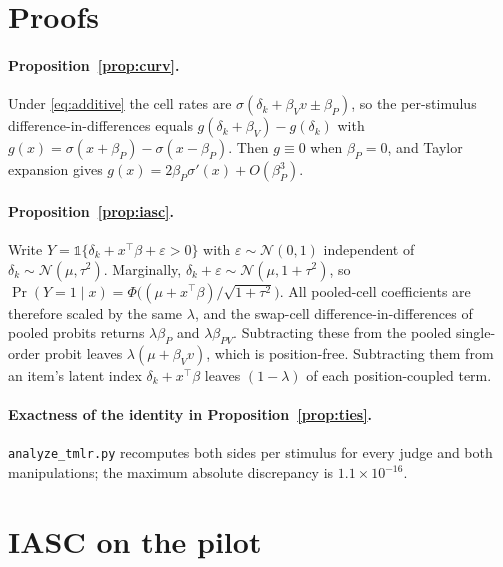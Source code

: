 \documentclass[10pt]{article}
\theoremstyle{remark}
\begin{document}
\section{Proofs}
\label{app:proofs}

\paragraph{Proposition~\ref{prop:curv}.}
Under \eqref{eq:additive} the cell rates are
$\sigma(\delta_k+\beta_V v\pm\beta_P)$, so the per-stimulus
difference-in-differences equals $g(\delta_k+\beta_V)-g(\delta_k)$ with
$g(x)=\sigma(x+\beta_P)-\sigma(x-\beta_P)$. Then $g\equiv0$ when
$\beta_P=0$, and Taylor expansion gives
$g(x)=2\beta_P\sigma'(x)+O(\beta_P^3)$.

\paragraph{Proposition~\ref{prop:iasc}.}
Write $Y=\mathbb 1\{\delta_k+x^\top\beta+\varepsilon>0\}$ with
$\varepsilon\sim\mathcal N(0,1)$ independent of
$\delta_k\sim\mathcal N(\mu,\tau^2)$. Marginally,
$\delta_k+\varepsilon\sim\mathcal N(\mu,1+\tau^2)$, so
$\Pr(Y=1\mid x)=\Phi\bigl((\mu+x^\top\beta)/\sqrt{1+\tau^2}\bigr)$. All
pooled-cell coefficients are therefore scaled by the same $\lambda$, and
the swap-cell difference-in-differences of pooled probits returns
$\lambda\beta_P$ and $\lambda\beta_{PV}$. Subtracting these from the
pooled single-order probit leaves $\lambda(\mu+\beta_V v)$, which is
position-free. Subtracting them from an item's latent index
$\delta_k+x^\top\beta$ leaves $(1-\lambda)$ of each position-coupled
term.

\paragraph{Exactness of the identity in Proposition~\ref{prop:ties}.}
\texttt{analyze\_tmlr.py} recomputes both sides per stimulus for every
judge and both manipulations; the maximum absolute discrepancy is
$1.1\times10^{-16}$.

\section{IASC on the pilot}
\label{app:iasc}
\end{document}
